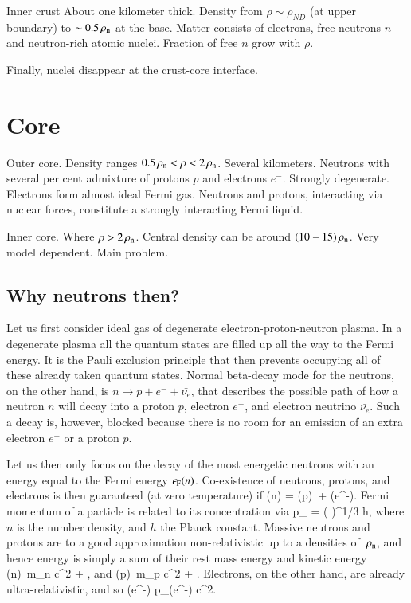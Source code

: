 Inner crust
About one kilometer thick.
Density from $\rho \sim \rho_{ND}$ (at upper boundary) to $\sim 0.5 \, \rho_{\mathrm{n}} $ at the base.
Matter consists of electrons, free neutrons $n$ and neutron-rich atomic nuclei.
Fraction of free $n$ grow with $\rho$.

Finally, nuclei disappear at the crust-core interface.

\section{Core}

Outer core.
Density ranges $0.5 \, \rho_{\mathrm{n}}  < \rho < 2\, \rho_{\mathrm{n}} $.
Several kilometers.
Neutrons with several per cent admixture of protons $p$ and electrons $e^{-}$.
Strongly degenerate.
Electrons form almost ideal Fermi gas.
Neutrons and protons, interacting via nuclear forces, constitute a strongly interacting Fermi liquid.

Inner core.
Where $\rho > 2\, \rho_{\mathrm{n}} $.
Central density can be around $(10-15)\, \rho_{\mathrm{n}} $.
Very model dependent.
Main problem.

\subsection{Why neutrons then?}
Let us first consider ideal gas of degenerate electron-proton-neutron plasma.
In a degenerate plasma all the quantum states are filled up all the way to the Fermi energy.
It is the Pauli exclusion principle that then prevents occupying all of these already taken quantum states.
Normal beta-decay mode for the neutrons, on the other hand, is $n \rightarrow p + e^{-} + \bar{\nu_{e}}$, that describes the possible path of how a neutron $n$ will decay into a proton $p$, electron $e^{-}$, and electron neutrino $\bar{\nu_{e}}$.
Such a decay is, however, blocked because there is no room for an emission of an extra electron $e^{-}$ or a proton $p$.\cite[see e.g.][]{Phillips94}

Let us then only focus on the decay of the most energetic neutrons with an energy equal to the Fermi energy $\epsilon_{\mathrm{F}} (n)$.
Co-existence of neutrons, protons, and electrons is then guaranteed (at zero temperature) if 
\be
\ef(n) = \ef(p) + \ef(e^{-}).
\ee
Fermi momentum of a particle is related to its concentration via
\be
p_{} = \left(  \right)^{1/3} h,
\ee
where $n$ is the number density, and $h$ the Planck constant.
Massive neutrons and protons are to a good approximation non-relativistic up to a densities of $\, \rho_{\mathrm{n}} $, and hence energy is simply a sum of their rest mass energy and kinetic energy
\be
\ef(n) \approx m_n c^2 + ,
\ee
and
\be
\ef(p) \approx m_p c^2 + .
\ee
Electrons, on the other hand, are already ultra-relativistic, and so
\be
\ef(e^{-}) \approx p_{}(e^{-}) c^2.
\ee

